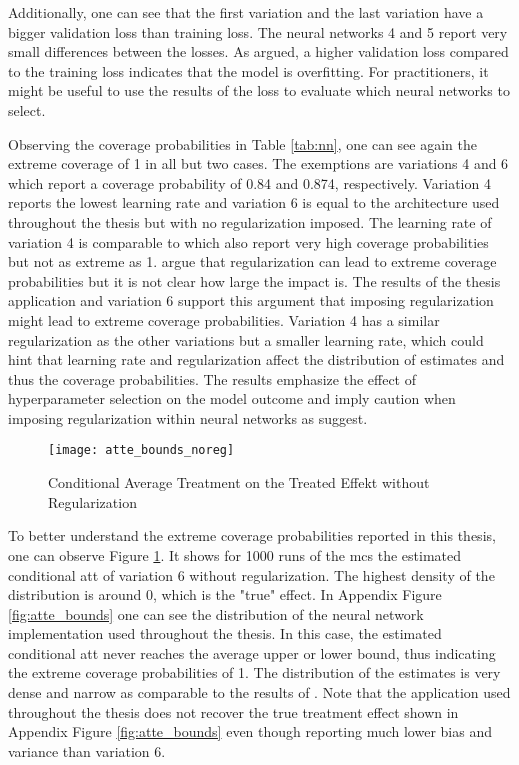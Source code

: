 Additionally, one can see that the first variation and the last variation have a bigger validation loss than training loss.
The neural networks 4 and 5 report very small differences between the losses.
As argued, a higher validation loss compared to the training loss indicates that the model is overfitting.
For practitioners, it might be useful to use the results of the loss to evaluate which neural networks to select.



Observing the coverage probabilities in Table \ref{tab:nn}, one can see again the extreme coverage of 1 in all but two cases.
The exemptions are variations 4 and 6 which report a coverage probability of 0.84 and 0.874, respectively.
Variation 4 reports the lowest learning rate and variation 6 is equal to the architecture used throughout the thesis but with no regularization imposed.
The learning rate of variation 4 is comparable to \citet{farrellDeepNeuralNetworks2021} which also report very high coverage probabilities but not as extreme as 1.
\citet{farrellDeepNeuralNetworks2021} argue that regularization can lead to extreme coverage probabilities but it is not clear how large the impact is.
The results of the thesis application and variation 6 support this argument that imposing regularization might lead to extreme coverage probabilities.
Variation 4 has a similar regularization as the other variations but a smaller learning rate, which could hint that learning rate and regularization affect the distribution of estimates and thus the coverage probabilities.
The results emphasize the effect of hyperparameter selection on the model outcome and imply caution when imposing regularization within neural networks as \citet{farrellDeepNeuralNetworks2021} suggest.

\begin{figure}[h]
\centering
\caption{Conditional Average Treatment on the Treated Effekt without Regularization}
\texttt{[image: atte\_bounds\_noreg]}
\label{fig:atte_bounds_noreg}
\end{figure}
To better understand the extreme coverage probabilities reported in this thesis, one can observe Figure \ref{fig:atte_bounds_noreg}.
It shows for 1000 runs of the \ac{mcs} the estimated conditional \ac{att} of variation 6 without regularization.
The highest density of the distribution is around 0, which is the "true" effect.
In Appendix Figure \ref{fig:atte_bounds} one can see the distribution of the neural network implementation used throughout the thesis.
In this case, the estimated conditional \ac{att} never reaches the average upper or lower bound, thus indicating the extreme coverage probabilities of 1.
The distribution of the estimates is very dense and narrow as comparable to the results of \citet{farrellDeepNeuralNetworks2021}.
Note that the application used throughout the thesis does not recover the true treatment effect shown in Appendix Figure \ref{fig:atte_bounds} even though reporting much lower bias and variance than variation 6.

